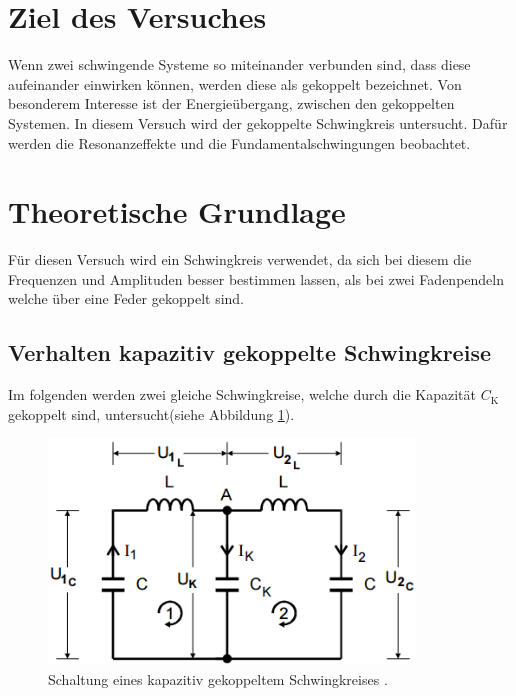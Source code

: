 \section{Ziel des Versuches}
Wenn zwei schwingende Systeme so miteinander verbunden sind, dass diese aufeinander einwirken können, werden diese als gekoppelt bezeichnet. Von besonderem Interesse ist der Energieübergang, zwischen den gekoppelten Systemen. In diesem Versuch wird der gekoppelte Schwingkreis untersucht. Dafür werden die Resonanzeffekte und die Fundamentalschwingungen beobachtet.

\section{Theoretische Grundlage}
\label{sec:Theorie}
Für diesen Versuch wird ein Schwingkreis verwendet, da sich bei diesem die Frequenzen und Amplituden besser bestimmen lassen, als bei zwei Fadenpendeln welche über eine Feder gekoppelt sind.

\subsection{Verhalten kapazitiv gekoppelte Schwingkreise}
Im folgenden werden zwei gleiche Schwingkreise, welche durch die Kapazität  $C_\text{K}$ gekoppelt sind, untersucht(siehe Abbildung \ref{fig:GekSch}).

\begin{figure}[H] %
	\centering
	\includegraphics[height=6cm]{picture/GekoppelterSchwingkreis.PNG}
	\caption{Schaltung eines kapazitiv gekoppeltem Schwingkreises \cite{sample}.}
	\label{fig:GekSch}
\end{figure}

